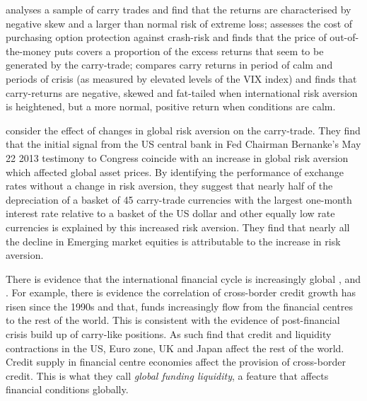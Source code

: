 \documentclass[12pt, a4paper, oneside]{article} %
\begin{document}
\citet{BrunnermeierCarry} analyses a sample of carry trades and find that the returns are characterised by negative skew and a larger than normal risk of extreme loss; \citet{JurekCrash} assesses the cost of purchasing option protection against crash-risk and finds that the price of out-of-the-money puts covers a proportion of the excess returns that seem to be generated by the carry-trade; \citet{Hayward2013} compares carry returns in period of calm and periods of crisis (as measured by elevated levels of the VIX index) and finds that carry-returns are negative, skewed and fat-tailed when international risk aversion is heightened, but a more normal, positive return when conditions are calm. 

 
\citet{NYFedtaper} consider the effect of changes in global risk aversion on the carry-trade.  They find that the initial signal from the US central bank in Fed Chairman Bernanke's May 22 2013 testimony to Congress coincide with an increase in global risk aversion which affected global asset prices. %
By identifying the performance of exchange rates without a change in risk aversion, they suggest that nearly half of the depreciation of a basket of 45 carry-trade currencies with the largest one-month interest rate relative to a basket of the US dollar and other equally low rate currencies is explained by this increased risk aversion. They find that nearly all the decline in Emerging market equities is attributable to the increase in risk aversion.

There is evidence that the international financial cycle is increasingly global \citet{Rey2013}, \citet{Obstfeld2014} and \citet{Bruno2014}.  %
For example, there is evidence the correlation of cross-border credit growth has risen since the 1990s and that, funds increasingly flow from the financial centres to the rest of the world. This is consistent with the evidence of post-financial crisis build up of carry-like positions.  As such \citet{Cerutti2014} find that credit and liquidity contractions in  the US, Euro zone, UK and Japan affect the rest of the world. Credit supply in financial centre economies affect the provision of cross-border credit.  This is what they call \emph{global funding liquidity}, a feature that affects financial conditions globally. 
\end{document}
